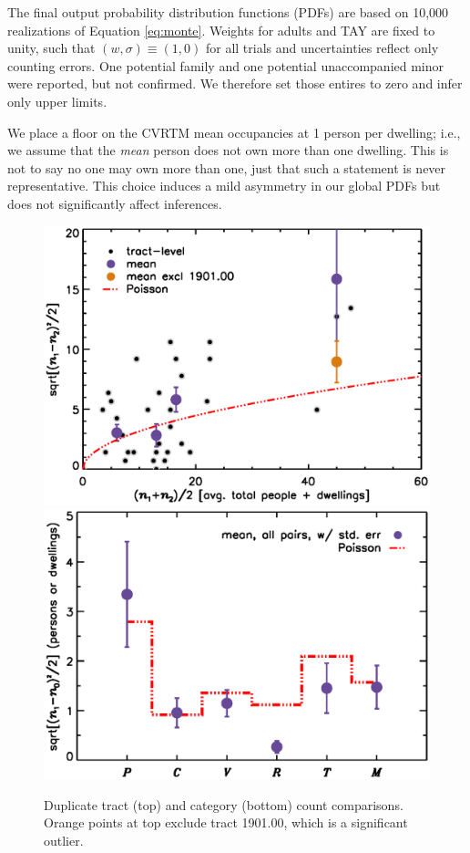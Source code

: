 \documentclass[11pt,twocolumn]{article}
\begin{document}
The final output probability distribution functions (PDFs) are based on 10,000 realizations of 
Equation \ref{eq:monte}. Weights for adults and TAY are fixed to unity, such that 
$(w,\sigma)\equiv(1,0)$ for all trials and uncertainties reflect only counting errors. One potential 
family and one potential unaccompanied minor were reported, but not confirmed. We therefore
set those entires to zero and infer only upper limits.

We place a floor on the CVRTM mean occupancies at 1 person per dwelling; i.e., we assume that the 
{\it mean} person does not own more than one dwelling. This is not to say no one may own more than 
one, just that such a statement is never representative. This choice induces a mild asymmetry in our 
global PDFs but does not significantly affect inferences.

\begin{figure}[t]
\centering
	\includegraphics[width=\linewidth, trim = 1cm 0cm 0cm 0cm]{intDupeChar}\\
	\includegraphics[width=\linewidth, trim = 1cm 0.5cm 0cm 0cm]{catDupeChar}
\caption{Duplicate tract (top) and category (bottom) count comparisons. Orange 
		points at top exclude tract 1901.00, which is a significant outlier.}
\label{fig:dupeChar}
\end{figure}
\end{document}
